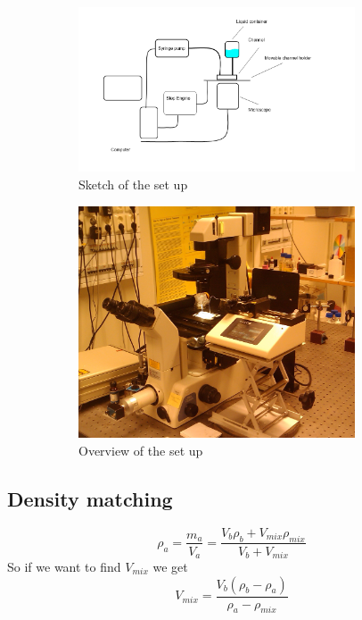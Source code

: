 \begin{figure}[H]
\centering
\begin{subfigure}[b]{0.45\textwidth}
\includegraphics[width=0.9\textwidth]{figures/setupsketch.png}
\caption{Sketch of the set up}\label{fig:setupsketch}
\end{subfigure}
\begin{subfigure}[b]{0.45\textwidth}
\includegraphics[width=0.9\textwidth]{figures/ExperimentalOverview.jpg}
\caption{Overview of the set up}\label{fig:setuppicture}
\end{subfigure}
\caption{}
\label{fig:experimentalsetup}
\end{figure}



\subsection{Density matching}


\begin{equation}
\rho_{a} = 	\frac {m_{a}}{V_{a}} =
				\frac{V_{b}\rho_{b} + V_{mix}\rho_{mix}}{V_b + V_{mix}} 
\end{equation}
So if we want to find $V_{mix}$ we get
\begin{equation}
V_{mix} = \frac{ V_{b}(\rho_{b} - \rho_{a})}{\rho_{a} - \rho_{mix}} 
\end{equation}


